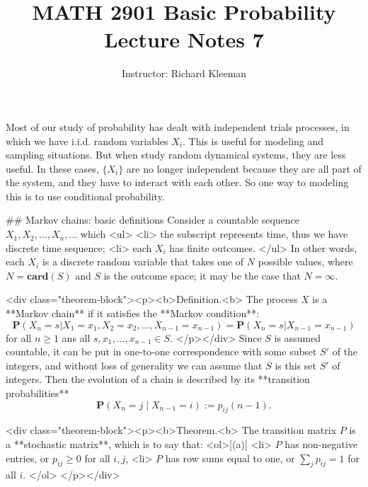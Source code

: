 


\title{MATH 2901 Basic Probability Lecture Notes 7}
\author{Instructor: Richard Kleeman}
\date{}
\maketitle


Most of our study of probability has dealt with independent trials processes, in which we have i.i.d. random variables $X_i$. This is useful for modeling and sampling situations. But when study random dynamical systems, they are less useful. In these cases, $\{X_i\}$ are no longer independent because they are all part of the system, and they have to interact with each other. So one way to modeling this is to use conditional probability. 

## Markov chains: basic definitions
Consider a countable sequence $X_1, X_2, \dots, X_n, \dots$ which 
<ul>
    <li> the subscript represents time, thus we have discrete time sequence;
    <li> each $X_i$ has finite outcomes.
</ul>
In other words, each $X_i$ is a discrete random variable that takes one of $N$ possible values, where 
$N = \mathbf{card}(S)$ and $S$ is the outcome space; it may be the case that $N = \infty$.

<div class="theorem-block"><p><b>Definition.<b> 
The process $X$ is a **Markov chain** if it satisfies the **Markov condition**:
$$\begin{equation}
    \mathbf{P}\left(X_{n}=s | X_{1}=x_{1}, X_{2}=x_{2}, \ldots, X_{n-1}=x_{n-1}\right)=\mathbf{P}\left(X_{n}=s | X_{n-1}=x_{n-1}\right)
\end{equation}$$
for all $n\geq 1$ ans all $s, x_1, \dots, x_{n-1} \in S$.
</p></div>
Since $S$ is assumed countable, it can be put in one-to-one correspondence with some subset $S'$ of the integers, and without loss of generality we can assume that $S$ is this set $S'$ of integers. Then the evolution of a chain is described by its **transition probabilities** 
$$$$$$$$\begin{equation}
    \label{eq:7.1}
    \tag{7-1}
    \mathbf{P}(X_{n} = j \;\vert\; X_{n-1} = i) := p_{ij}(n-1).
\end{equation}$$$$$$$$

<div class="theorem-block"><p><b>Theorem.<b> 
The transition matrix $P$ is a **stochastic matrix**, which is to say that: 
<ol>[(a)]
    <li> $P$ has non-negative entries, or $p_{ij} \geq 0$ for all $i, j$, 
    <li> $P$ has row sums equal to one, or $\sum_j p_{ij} = 1$ for all $i$.
</ol>
</p></div>

